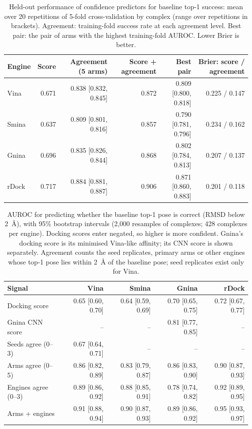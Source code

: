 \begin{table}[h]
  \centering
  \caption{Held-out performance of confidence predictors for baseline top-1 success: mean
    over 20 repetitions of 5-fold cross-validation by complex (range over repetitions in
    brackets). Agreement: training-fold success rate at each agreement level. Best pair:
    the pair of arms with the highest training-fold AUROC. Lower Brier is better.}
  \label{tab:agreement-cv}
  \small
  \setlength{\tabcolsep}{4pt}
  \begin{tabular}{lrrrrr}
    \toprule
    Engine & Score & Agreement (5 arms) & Score + agreement & Best pair & Brier: score / agreement \\
    \midrule
    Vina & 0.671 & 0.838 [0.832, 0.845] & 0.872 & 0.809 [0.800, 0.818] & 0.225 / 0.147 \\
    Smina & 0.637 & 0.809 [0.801, 0.816] & 0.857 & 0.790 [0.781, 0.796] & 0.234 / 0.162 \\
    Gnina & 0.696 & 0.835 [0.826, 0.844] & 0.868 & 0.802 [0.784, 0.813] & 0.207 / 0.137 \\
    rDock & 0.717 & 0.884 [0.881, 0.887] & 0.906 & 0.871 [0.860, 0.883] & 0.201 / 0.118 \\
    \bottomrule
  \end{tabular}
\end{table}

\begin{table}[h]
  \centering
  \caption{AUROC for predicting whether the baseline top-1 pose is correct (RMSD below
    \SI{2}{\angstrom}), with 95\% bootstrap intervals (2,000 resamples of complexes; 428
    complexes per engine). Docking scores enter negated, so higher is more confident.
    Gnina's docking score is its minimised Vina-like affinity; its CNN score is shown
    separately. Agreement counts the seed replicates, primary arms or other engines whose
    top-1 pose lies within \SI{2}{\angstrom} of the baseline pose; seed replicates exist
    only for Vina.}
  \label{tab:agreement}
  \small
  \setlength{\tabcolsep}{4pt}
  \begin{tabular}{lrrrr}
    \toprule
    Signal & Vina & Smina & Gnina & rDock \\
    \midrule
    Docking score & 0.65 [0.60, 0.70] & 0.64 [0.59, 0.69] & 0.70 [0.65, 0.75] & 0.72 [0.67, 0.77] \\
    Gnina CNN score & -- & -- & 0.81 [0.77, 0.85] & -- \\
    Seeds agree (0--3) & 0.67 [0.64, 0.71] & -- & -- & -- \\
    Arms agree (0--5) & 0.86 [0.82, 0.89] & 0.83 [0.79, 0.87] & 0.86 [0.83, 0.90] & 0.90 [0.87, 0.93] \\
    Engines agree (0--3) & 0.89 [0.86, 0.92] & 0.88 [0.85, 0.91] & 0.78 [0.74, 0.82] & 0.92 [0.89, 0.95] \\
    Arms + engines & 0.91 [0.88, 0.94] & 0.90 [0.87, 0.93] & 0.89 [0.86, 0.92] & 0.95 [0.93, 0.97] \\
    \bottomrule
  \end{tabular}
\end{table}

